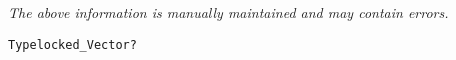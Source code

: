 \label{pkg:float\_vector}

{\tiny \it The above information is manually maintained and may contain errors.}
\begin{verbatim}
Typelocked_Vector?
\end{verbatim}
